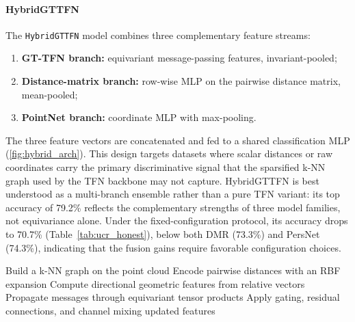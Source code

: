 \documentclass[a4paper,11pt]{article}
\begin{document}
\paragraph{HybridGTTFN}
The \texttt{HybridGTTFN} model combines three complementary feature streams:
\begin{enumerate}
    \item \textbf{GT-TFN branch:} equivariant message-passing features, invariant-pooled;
    \item \textbf{Distance-matrix branch:} row-wise MLP on the pairwise distance matrix, mean-pooled;
    \item \textbf{PointNet branch:} coordinate MLP with max-pooling.
\end{enumerate}
The three feature vectors are concatenated and fed to a shared classification MLP (\cref{fig:hybrid_arch}).
This design targets datasets where scalar distances or raw coordinates carry the primary discriminative signal that the sparsified k-NN graph used by the TFN backbone may not capture.
HybridGTTFN is best understood as a multi-branch ensemble rather than a pure TFN variant: its top accuracy of 79.2\% reflects the complementary strengths of three model families, not equivariance alone.
Under the fixed-configuration protocol, its accuracy drops to 70.7\% (Table~\ref{tab:ucr_honest}), below both DMR (73.3\%) and PersNet (74.3\%), indicating that the fusion gains require favorable configuration choices.

\begin{algorithm}[H]
\SetAlgoLined
\caption{TFN Layer Overview}
\label{alg:tfn_layer}

Build a k-NN graph on the point cloud\;
Encode pairwise distances with an RBF expansion\;
Compute directional geometric features from relative vectors\;
Propagate messages through equivariant tensor products\;
Apply gating, residual connections, and channel mixing\;
\Return updated features\;
\end{algorithm}
\end{document}
